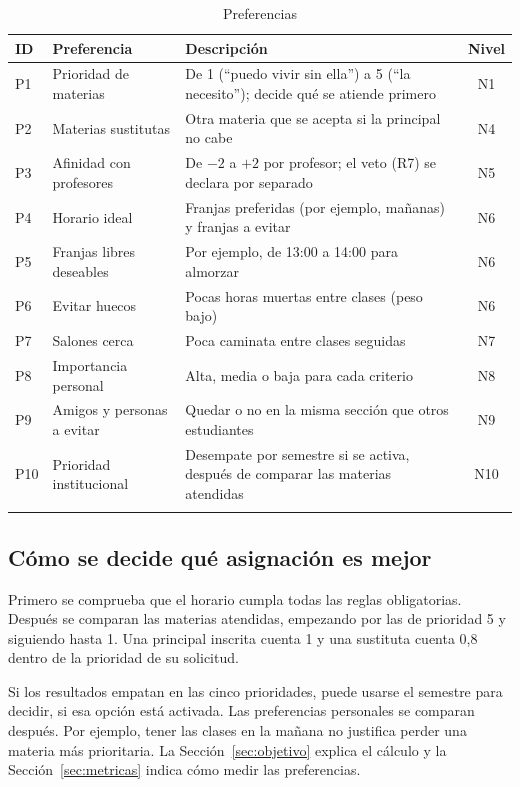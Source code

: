 \documentclass[pdflatex,sn-mathphys-num]{sn-jnl}%
\begin{document}
\begin{table}[htbp]
\caption{Preferencias}\label{tab:prefs}
\small
\begin{tabularx}{\textwidth}{@{}llLc@{}}
\toprule
ID & Preferencia & Descripción & Nivel \\
\midrule
P1 & Prioridad de materias & De 1 (``puedo vivir sin ella'') a 5 (``la necesito''); decide qué se atiende primero & N1 \\
P2 & Materias sustitutas & Otra materia que se acepta si la principal no cabe & N4 \\
P3 & Afinidad con profesores & De $-2$ a $+2$ por profesor; el veto (R7) se declara por separado & N5 \\
P4 & Horario ideal & Franjas preferidas (por ejemplo, mañanas) y franjas a evitar & N6 \\
P5 & Franjas libres deseables & Por ejemplo, de 13:00 a 14:00 para almorzar & N6 \\
P6 & Evitar huecos & Pocas horas muertas entre clases (peso bajo) & N6 \\
P7 & Salones cerca & Poca caminata entre clases seguidas & N7 \\
P8 & Importancia personal & Alta, media o baja para cada criterio & N8 \\
P9 & Amigos y personas a evitar & Quedar o no en la misma sección que otros estudiantes & N9 \\
P10 & Prioridad institucional & Desempate por semestre si se activa, después de comparar las materias atendidas & N10 \\
\botrule
\end{tabularx}
\end{table}

\subsection{Cómo se decide qué asignación es mejor}\label{sec:mejor}

Primero se comprueba que el horario cumpla todas las reglas obligatorias. Después se comparan las materias atendidas, empezando por las de prioridad 5 y siguiendo hasta 1. Una principal inscrita cuenta 1 y una sustituta cuenta 0,8 dentro de la prioridad de su solicitud.

Si los resultados empatan en las cinco prioridades, puede usarse el semestre para decidir, si esa opción está activada. Las preferencias personales se comparan después. Por ejemplo, tener las clases en la mañana no justifica perder una materia más prioritaria. La Sección~\ref{sec:objetivo} explica el cálculo y la Sección~\ref{sec:metricas} indica cómo medir las preferencias.
\end{document}
